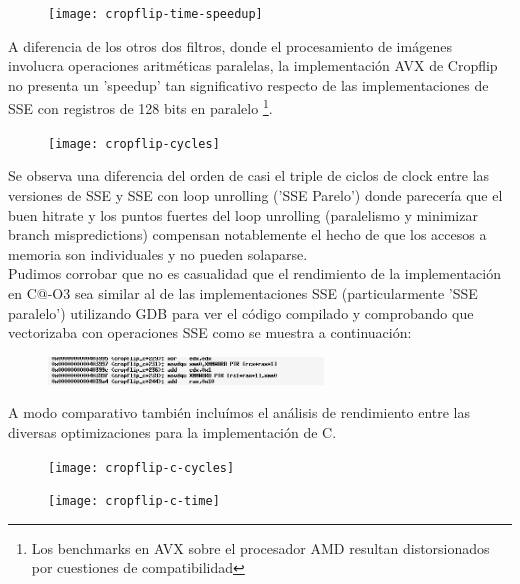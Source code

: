 \begin{figure}[h]
\centering
\texttt{[image: cropflip-time-speedup]} 
\label{fig:cropflip-time-speedup}
\end{figure}

A diferencia de los otros dos filtros, donde el procesamiento de imágenes involucra operaciones aritméticas paralelas, la implementación AVX de	 Cropflip no presenta un 'speedup' tan significativo respecto de las implementaciones de SSE con registros de 128 bits en paralelo \footnote{Los benchmarks en AVX sobre el procesador AMD resultan distorsionados por cuestiones de compatibilidad}. 

\begin{figure}[h]
\centering
\texttt{[image: cropflip-cycles]} 
\label{fig:cropflip-cycles}
\end{figure}



Se observa una diferencia del orden de casi el triple de ciclos de clock entre las versiones de SSE y SSE con loop unrolling ('SSE Parelo') donde parecería que el buen hitrate y los puntos fuertes del loop unrolling (paralelismo y minimizar branch mispredictions)  compensan notablemente el hecho de que los accesos a memoria son individuales y no pueden solaparse.
\\
Pudimos corrobar que no es casualidad que el rendimiento de la implementación en C@-O3 sea similar al de las implementaciones SSE (particularmente 'SSE paralelo') utilizando GDB para ver el código compilado y comprobando que vectorizaba con operaciones SSE como se muestra a continuación:

\begin{figure}[h]
\centering
\includegraphics[width=0.65\textwidth]{untitled}
\end{figure}

A modo comparativo también incluímos el análisis de rendimiento entre las diversas optimizaciones para la implementación de C.

\begin{figure}[h]
\centering
\texttt{[image: cropflip-c-cycles]} 
\label{fig:cropflip-c-cycles}
\end{figure}

\begin{figure}[h]
\centering
\texttt{[image: cropflip-c-time]} 
\label{fig:cropflip-c-time}
\end{figure}

